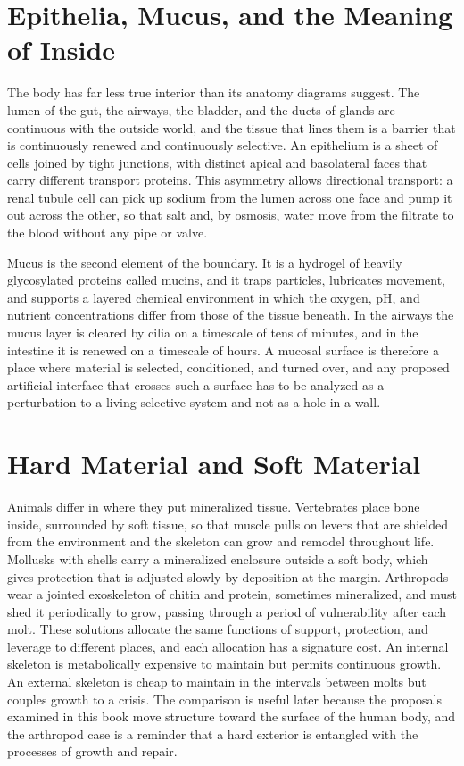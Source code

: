 \documentclass[11pt,openany]{book}
\theoremstyle{definition}
\theoremstyle{remark}
\begin{document}
\section{Epithelia, Mucus, and the Meaning of Inside}

The body has far less true interior than its anatomy diagrams suggest. The lumen of the gut, the airways, the bladder, and the ducts of glands are continuous with the outside world, and the tissue that lines them is a barrier that is continuously renewed and continuously selective. An epithelium is a sheet of cells joined by tight junctions, with distinct apical and basolateral faces that carry different transport proteins. This asymmetry allows directional transport: a renal tubule cell can pick up sodium from the lumen across one face and pump it out across the other, so that salt and, by osmosis, water move from the filtrate to the blood without any pipe or valve.

Mucus is the second element of the boundary. It is a hydrogel of heavily glycosylated proteins called mucins, and it traps particles, lubricates movement, and supports a layered chemical environment in which the oxygen, pH, and nutrient concentrations differ from those of the tissue beneath. In the airways the mucus layer is cleared by cilia on a timescale of tens of minutes, and in the intestine it is renewed on a timescale of hours. A mucosal surface is therefore a place where material is selected, conditioned, and turned over, and any proposed artificial interface that crosses such a surface has to be analyzed as a perturbation to a living selective system and not as a hole in a wall.

\section{Hard Material and Soft Material}

Animals differ in where they put mineralized tissue. Vertebrates place bone inside, surrounded by soft tissue, so that muscle pulls on levers that are shielded from the environment and the skeleton can grow and remodel throughout life. Mollusks with shells carry a mineralized enclosure outside a soft body, which gives protection that is adjusted slowly by deposition at the margin. Arthropods wear a jointed exoskeleton of chitin and protein, sometimes mineralized, and must shed it periodically to grow, passing through a period of vulnerability after each molt. These solutions allocate the same functions of support, protection, and leverage to different places, and each allocation has a signature cost. An internal skeleton is metabolically expensive to maintain but permits continuous growth. An external skeleton is cheap to maintain in the intervals between molts but couples growth to a crisis. The comparison is useful later because the proposals examined in this book move structure toward the surface of the human body, and the arthropod case is a reminder that a hard exterior is entangled with the processes of growth and repair.
\end{document}
